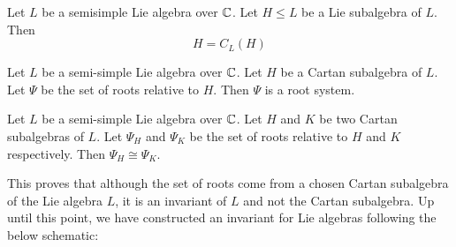 \documentclass[a4paper]{article}
\begin{document}
\begin{prp}{}{} Let $L$ be a semisimple Lie algebra over $\mathbb{C}$. Let $H\leq L$ be a Lie subalgebra of $L$. Then $$H=C_L(H)$$
\end{prp}

\begin{prp}{}{} Let $L$ be a semi-simple Lie algebra over $\mathbb{C}$. Let $H$ be a Cartan subalgebra of $L$. Let $\Psi$ be the set of roots relative to $H$. Then $\Psi$ is a root system. 
\end{prp}

\begin{prp}{}{} Let $L$ be a semi-simple Lie algebra over $\mathbb{C}$. Let $H$ and $K$ be two Cartan subalgebras of $L$. Let $\Psi_H$ and $\Psi_K$ be the set of roots relative to $H$ and $K$ respectively. Then $\Psi_H\cong\Psi_K$. 
\end{prp}

This proves that although the set of roots come from a chosen Cartan subalgebra of the Lie algebra $L$, it is an invariant of $L$ and not the Cartan subalgebra. Up until this point, we have constructed an invariant for Lie algebras following the below schematic: \\~\\
 \\
\end{document}
